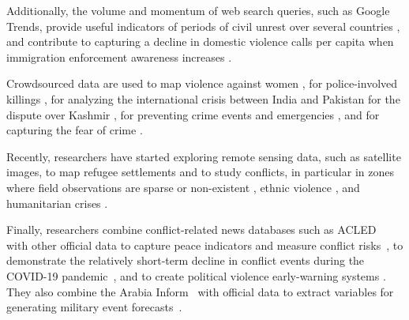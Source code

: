 \documentclass{bmcart}
\begin{document}
Additionally, the volume and momentum of web search queries, such as Google Trends, provide useful indicators of periods of civil unrest over several countries \cite{qi2016open, qi2016association}, and contribute to capturing a decline in domestic violence calls per capita when immigration enforcement awareness increases \cite{muchow2020immigration}.

Crowdsourced data are used to map violence against women \cite{lea2017women}, for police-involved killings \cite{ozkan2018validating}, for analyzing the international crisis between India and Pakistan for the dispute over Kashmir \cite{palakodety2019hope}, for preventing crime events and emergencies \cite{rumi2020realtime}, and for capturing the fear of crime \cite{solymosi2020towards}.

Recently, researchers have started exploring remote sensing data, such as satellite images, to map refugee settlements \cite{quinn2018humanitarian,witmer2015remote} and to study conflicts, in particular in zones where field observations are sparse or non-existent \cite{witmer2015remote}, ethnic violence \cite{marx2013landsat}, and humanitarian crises \cite{li2014can}. 

Finally, researchers combine conflict-related news databases such as ACLED~\cite{acled_2010} with other official data to capture peace indicators and measure conflict risks~\cite{brauer2020conflict, firchow2017measuring}, to demonstrate the relatively short-term decline in conflict events during the COVID-19 pandemic~\cite{ide2021covid}, and to create political violence early-warning systems \cite{hegre2019views}.
They also combine the Arabia Inform~\cite{arabiainform} with official data to extract variables for generating military event forecasts~\cite{hossain2020forecasting}.
\end{document}

